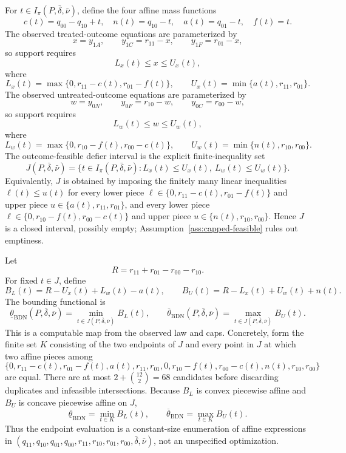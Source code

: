 \documentclass[11pt]{article}
\theoremstyle{definition}
\theoremstyle{plain}
\theoremstyle{remark}
\begin{document}
For \(t\in I_\pi(P,\bar\delta,\bar\nu)\), define the four affine mass
functions
\[
c(t)=q_{00}-q_{10}+t,\quad n(t)=q_{10}-t,\quad
a(t)=q_{01}-t,\quad f(t)=t.
\]
The observed treated-outcome equations are parameterized by
\[
x=y_{1A},\qquad y_{1C}=r_{11}-x,\qquad y_{1F}=r_{01}-x,
\]
so support requires
\[
L_x(t)\le x\le U_x(t),
\]
where
\[
L_x(t)=\max\{0,r_{11}-c(t),r_{01}-f(t)\},\qquad
U_x(t)=\min\{a(t),r_{11},r_{01}\}.
\]
The observed untreated-outcome equations are parameterized by
\[
w=y_{0N},\qquad y_{0F}=r_{10}-w,\qquad y_{0C}=r_{00}-w,
\]
so support requires
\[
L_w(t)\le w\le U_w(t),
\]
where
\[
L_w(t)=\max\{0,r_{10}-f(t),r_{00}-c(t)\},\qquad
U_w(t)=\min\{n(t),r_{10},r_{00}\}.
\]
The outcome-feasible defier interval is the explicit finite-inequality set
\[
J(P,\bar\delta,\bar\nu)=
\{t\in I_\pi(P,\bar\delta,\bar\nu): L_x(t)\le U_x(t),\ L_w(t)\le U_w(t)\}.
\]
Equivalently, \(J\) is obtained by imposing the finitely many linear
inequalities \(\ell(t)\le u(t)\) for every lower piece
\(\ell\in\{0,r_{11}-c(t),r_{01}-f(t)\}\) and upper piece
\(u\in\{a(t),r_{11},r_{01}\}\), and every lower piece
\(\ell\in\{0,r_{10}-f(t),r_{00}-c(t)\}\) and upper piece
\(u\in\{n(t),r_{10},r_{00}\}\).  Hence \(J\) is a closed interval, possibly
empty; Assumption~\ref{ass:capped-feasible} rules out emptiness.

Let
\[
R=r_{11}+r_{01}-r_{00}-r_{10}.
\]
For fixed \(t\in J\), define
\[
B_L(t)=R-U_x(t)+L_w(t)-a(t),
\qquad
B_U(t)=R-L_x(t)+U_w(t)+n(t).
\]
The bounding functional is
\[
\underline\theta_{\mathrm{BDN}}(P,\bar\delta,\bar\nu)=
\min_{t\in J(P,\bar\delta,\bar\nu)}B_L(t),
\qquad
\overline\theta_{\mathrm{BDN}}(P,\bar\delta,\bar\nu)=
\max_{t\in J(P,\bar\delta,\bar\nu)}B_U(t).
\]
This is a computable map from the observed law and caps.  Concretely, form the
finite set \(K\) consisting of the two endpoints of \(J\) and every point in
\(J\) at which two affine pieces among
\[
\{0,r_{11}-c(t),r_{01}-f(t),a(t),r_{11},r_{01},
  0,r_{10}-f(t),r_{00}-c(t),n(t),r_{10},r_{00}\}
\]
are equal.  There are at most \(2+\binom{12}{2}=68\) candidates before
discarding duplicates and infeasible intersections.  Because \(B_L\) is
convex piecewise affine and \(B_U\) is concave piecewise affine on \(J\),
\[
\underline\theta_{\mathrm{BDN}}=\min_{t\in K}B_L(t),
\qquad
\overline\theta_{\mathrm{BDN}}=\max_{t\in K}B_U(t).
\]
Thus the endpoint evaluation is a constant-size enumeration of affine
expressions in
\((q_{11},q_{10},q_{01},q_{00},r_{11},r_{10},r_{01},r_{00},
\bar\delta,\bar\nu)\), not an unspecified optimization.
\end{document}
